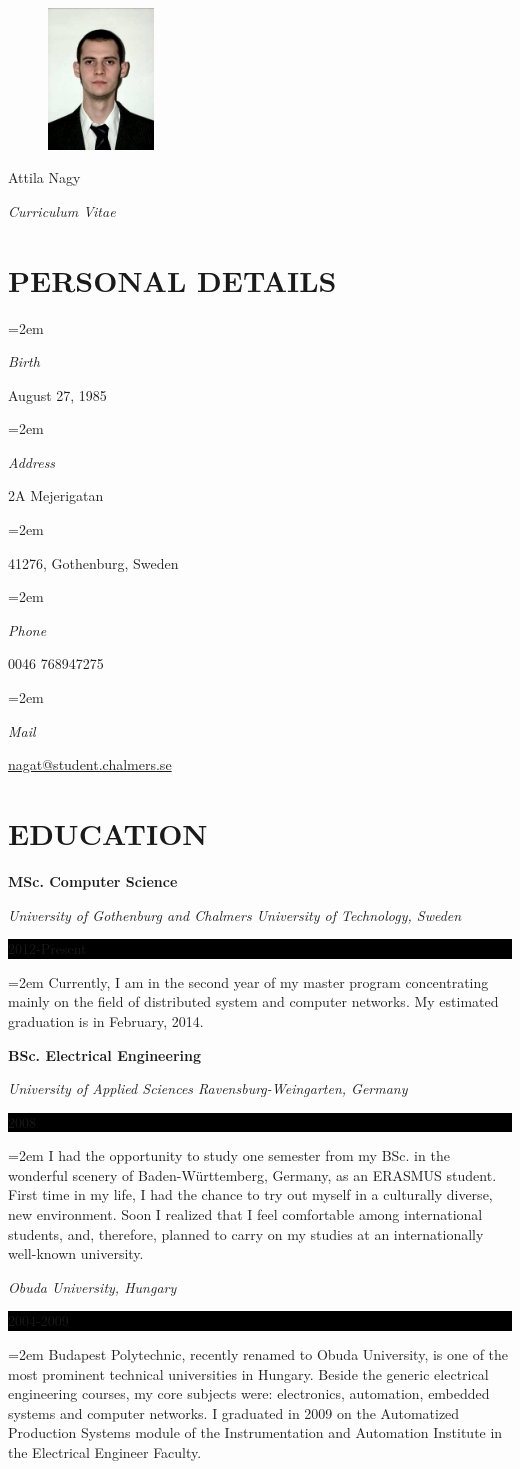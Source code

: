 \documentclass[paper=a4,fontsize=11pt]{scrartcl}	 			%
\newlength{\spacebox}
\newcommand{\sepspace}{\vspace*{1em}}			%
\newcommand{\MyName}[1]{
		\Huge \usefont{OT1}{phv}{b}{n} \hfill #1 		%
		\par \normalsize \normalfont}
\newcommand{\MySlogan}[1]{
		\large \usefont{OT1}{phv}{m}{n}\hfill \textit{#1} %
		\par \normalsize \normalfont}
\newcommand{\NewPart}[1]{\section*{\uppercase{#1}}}
\newcommand{\PersonalEntry}[2]{
		\noindent\hangindent=2em\hangafter=0 		%
		\parbox{\spacebox}{						%
		\textit{#1}}								%
		\hspace{1.5em} #2 \par}					%
\newcommand{\EducationEntry}[4]{
		\noindent \textbf{#1} \par 					%
		\noindent \textit{#3} \hfill					%
		\colorbox{Black}{%
			\parbox{6em}{%
			\hfill\color{White}#2}} \par				%
		\noindent\hangindent=2em\hangafter=0 \small #4 	%
		\normalsize \par}
\begin{document}
\begin{figure}
  \vspace*{-8em}
    \includegraphics[width=0.25\textwidth]{photo}
\end{figure}

\MyName{Attila Nagy}
\MySlogan{Curriculum Vitae}

\sepspace

\NewPart{Personal details}{}

\PersonalEntry{Birth}{August 27, 1985}
\PersonalEntry{Address}{2A Mejerigatan}
\PersonalEntry{}{41276, Gothenburg, Sweden}
\PersonalEntry{Phone}{0046 768947275}
\PersonalEntry{Mail}{\url{nagat@student.chalmers.se}}

\NewPart{Education}{}

\EducationEntry{MSc. Computer Science}{2012-Present}{University of Gothenburg and Chalmers University of Technology, Sweden}{Currently, I am in the second year of my master program concentrating mainly on the field of distributed system and computer networks. My estimated graduation is in February, 2014.}
\sepspace
\EducationEntry{BSc. Electrical Engineering}{2008}{University of Applied Sciences Ravensburg-Weingarten, Germany}{I had the opportunity to study one semester from my BSc. in the wonderful scenery of Baden-Württemberg, Germany, as an ERASMUS student. First time in my life, I had the chance to try out myself in a culturally diverse, new environment. Soon I realized that I feel comfortable among international students, and, therefore, planned to carry on my studies at an internationally well-known university.}
\EducationEntry{}{2004-2009}{Obuda University, Hungary}{Budapest Polytechnic, recently renamed to Obuda University, is one of the most prominent technical universities in Hungary. Beside the generic electrical engineering courses, my core subjects were: electronics, automation, embedded systems and computer networks. I graduated in 2009 on the Automatized Production Systems module of the Instrumentation and Automation Institute in the Electrical Engineer Faculty.}
\end{document}
